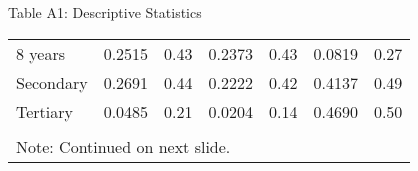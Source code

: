 \documentclass{beamer}
\begin{document}
\begin{frame}{Table A1: Descriptive Statistics}
\begin{adjustbox}{max width=\textwidth}
\begin{tabular}{l*{3}{cc}}
8 years             &      0.2515&        0.43&      0.2373&        0.43&      0.0819&        0.27\\
Secondary           &      0.2691&        0.44&      0.2222&        0.42&      0.4137&        0.49\\
Tertiary            &      0.0485&        0.21&      0.0204&        0.14&      0.4690&        0.50 \vspace{-4pt}\\
\bottomrule
\vspace{-18pt} \\
\multicolumn{7}{l}{\tiny Note: Continued on next slide.}\\
\end{tabular}
\end{adjustbox}
\end{frame} 
\end{document}
